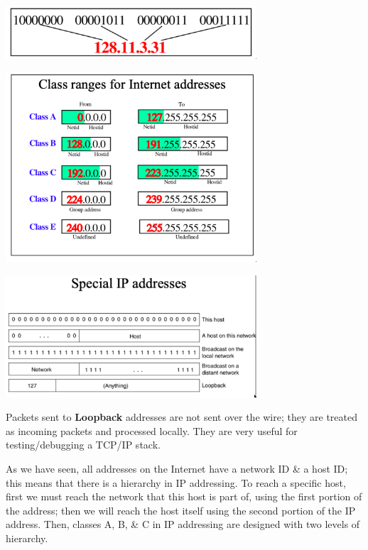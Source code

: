 \documentclass[11pt]{article}
\begin{document}
\begin{center}
    \includegraphics[width=0.7\textwidth]{dotteddecimalnotation.png}
\end{center}

\begin{center}
    \includegraphics[width=0.7\textwidth]{classrangesforinternetaddresses.png}
\end{center}

\begin{center}
    \includegraphics[width=0.7\textwidth]{specialipaddresses.png}
\end{center}

Packets sent to \textbf{Loopback} addresses are not sent over the wire; they are treated as incoming packets and processed 
locally. 
They are very useful for testing/debugging a TCP/IP stack.

As we have seen, all addresses on the Internet have a network ID \& a host ID; this means that there is a 
hierarchy in IP addressing. 
To reach a specific host, first we must reach the network that this host is part of, using the first 
portion of the address; then we will reach the host itself using the second portion of the IP address.
Then, classes A, B, \& C in IP addressing are designed with two levels of hierarchy.
\end{document}
